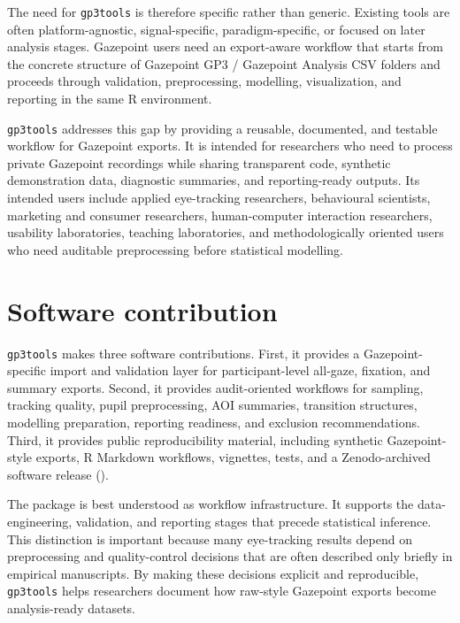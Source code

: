 \documentclass[
]{article}
\begin{document}
The need for \texttt{gp3tools} is therefore specific rather than
generic. Existing tools are often platform-agnostic, signal-specific,
paradigm-specific, or focused on later analysis stages. Gazepoint users
need an export-aware workflow that starts from the concrete structure of
Gazepoint GP3 / Gazepoint Analysis CSV folders and proceeds through
validation, preprocessing, modelling, visualization, and reporting in
the same R environment.

\texttt{gp3tools} addresses this gap by providing a reusable,
documented, and testable workflow for Gazepoint exports. It is intended
for researchers who need to process private Gazepoint recordings while
sharing transparent code, synthetic demonstration data, diagnostic
summaries, and reporting-ready outputs. Its intended users include
applied eye-tracking researchers, behavioural scientists, marketing and
consumer researchers, human-computer interaction researchers, usability
laboratories, teaching laboratories, and methodologically oriented users
who need auditable preprocessing before statistical modelling.

\section{Software contribution}\label{software-contribution}

\texttt{gp3tools} makes three software contributions. First, it provides
a Gazepoint-specific import and validation layer for participant-level
all-gaze, fixation, and summary exports. Second, it provides
audit-oriented workflows for sampling, tracking quality, pupil
preprocessing, AOI summaries, transition structures, modelling
preparation, reporting readiness, and exclusion recommendations. Third,
it provides public reproducibility material, including synthetic
Gazepoint-style exports, R Markdown workflows, vignettes, tests, and a
Zenodo-archived software release
().

The package is best understood as workflow infrastructure. It supports
the data-engineering, validation, and reporting stages that precede
statistical inference. This distinction is important because many
eye-tracking results depend on preprocessing and quality-control
decisions that are often described only briefly in empirical
manuscripts. By making these decisions explicit and reproducible,
\texttt{gp3tools} helps researchers document how raw-style Gazepoint
exports become analysis-ready datasets.
\end{document}
